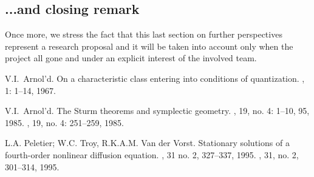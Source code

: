 \documentclass[11pt,oneside,letterpaper,leqno,final]{article}
\begin{document}
\subsection*{...and closing remark}
Once more, we stress the fact that this last section on further perspectives represent a research proposal and it will be taken into account only when the project all gone and under an explicit interest of the involved team.





\begin{thebibliography}{100}

V.I.~Arnol'd.
\newblock On a characteristic class entering into conditions of quantization.
, 1: 1--14, 1967.


V.I.~Arnol'd.
\newblock The Sturm theorems and symplectic geometry.
, 19, no. 4: 1--10, 95, 1985.
, 19, no. 4: 251--259, 1985.

L.A. Peletier; W.C. Troy, R.K.A.M. Van der Vorst.
\newblock Stationary solutions of a fourth-order nonlinear diffusion
equation.
,  31  no. 2, 327--337, 1995.
, 31,  no. 2,
301--314, 1995.
\end{thebibliography}
\end{document}
